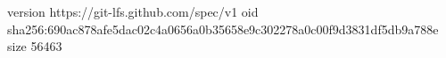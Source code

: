 version https://git-lfs.github.com/spec/v1
oid sha256:690ac878afe5dac02c4a0656a0b35658e9c302278a0c00f9d3831df5db9a788e
size 56463
